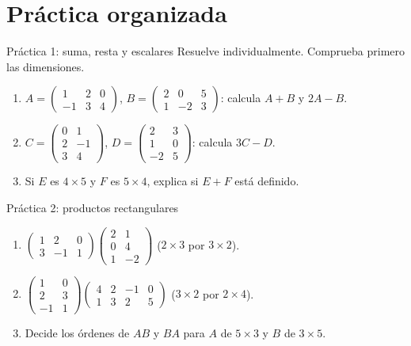 \documentclass[aspectratio=169,11pt]{beamer}
\begin{document}
\section{Práctica organizada}
\begin{frame}{Práctica 1: suma, resta y escalares}
Resuelve individualmente. Comprueba primero las dimensiones.
\small
\begin{enumerate}\item $A=\begin{pmatrix}1&2&0\\-1&3&4\end{pmatrix}$, $B=\begin{pmatrix}2&0&5\\1&-2&3\end{pmatrix}$: calcula $A+B$ y $2A-B$.\item $C=\begin{pmatrix}0&1\\2&-1\\3&4\end{pmatrix}$, $D=\begin{pmatrix}2&3\\1&0\\-2&5\end{pmatrix}$: calcula $3C-D$.\item Si $E$ es $4\times5$ y $F$ es $5\times4$, explica si $E+F$ está definido.\end{enumerate}
\end{frame}
\begin{frame}{Práctica 2: productos rectangulares}
\small
\begin{enumerate}\item $\begin{pmatrix}1&2&0\\3&-1&1\end{pmatrix}\begin{pmatrix}2&1\\0&4\\1&-2\end{pmatrix}$ ($2\times3$ por $3\times2$).\item $\begin{pmatrix}1&0\\2&3\\-1&1\end{pmatrix}\begin{pmatrix}4&2&-1&0\\1&3&2&5\end{pmatrix}$ ($3\times2$ por $2\times4$).\item Decide los órdenes de $AB$ y $BA$ para $A$ de $5\times3$ y $B$ de $3\times5$.\end{enumerate}
\end{frame}
\end{document}
